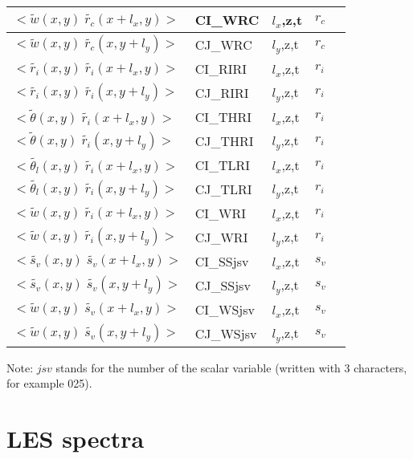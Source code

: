\begin{longtable}[c]{|p{}|p{}|p{}|p{}|p{}|}
$<\tilde{w}(x,y)\;\tilde{r_c}(x+l_x,y)>$             & CI\_WRC   & $l_x$,z,t & $r_c$       & \\\hline
$<\tilde{w}(x,y)\;\tilde{r_c}(x,y+l_y)>$             & CJ\_WRC   & $l_y$,z,t & $r_c$       & \\\hline
$<\tilde{r_i}(x,y)\;\tilde{r_i}(x+l_x,y)>$           & CI\_RIRI  & $l_x$,z,t & $r_i$       & \\\hline
$<\tilde{r_i}(x,y)\;\tilde{r_i}(x,y+l_y)>$           & CJ\_RIRI  & $l_y$,z,t & $r_i$       & \\\hline
$<\tilde{\theta}(x,y)\;\tilde{r_i}(x+l_x,y)>$        & CI\_THRI  & $l_x$,z,t & $r_i$       & \\\hline
$<\tilde{\theta}(x,y)\;\tilde{r_i}(x,y+l_y)>$        & CJ\_THRI  & $l_y$,z,t & $r_i$       & \\\hline
$<\tilde{\theta_l}(x,y)\;\tilde{r_i}(x+l_x,y)>$      & CI\_TLRI  & $l_x$,z,t & $r_i$       & \\\hline
$<\tilde{\theta_l}(x,y)\;\tilde{r_i}(x,y+l_y)>$      & CJ\_TLRI  & $l_y$,z,t & $r_i$       & \\\hline
$<\tilde{w}(x,y)\;\tilde{r_i}(x+l_x,y)>$             & CI\_WRI   & $l_x$,z,t & $r_i$       & \\\hline
$<\tilde{w}(x,y)\;\tilde{r_i}(x,y+l_y)>$             & CJ\_WRI   & $l_y$,z,t & $r_i$       & \\\hline
$<\tilde{s_v}(x,y)\;\tilde{s_v}(x+l_x,y)>$           & CI\_SSjsv & $l_x$,z,t & $s_v$       & \\\hline
$<\tilde{s_v}(x,y)\;\tilde{s_v}(x,y+l_y)>$           & CJ\_SSjsv & $l_y$,z,t & $s_v$       & \\\hline
$<\tilde{w}(x,y)\;\tilde{s_v}(x+l_x,y)>$             & CI\_WSjsv & $l_x$,z,t & $s_v$       & \\\hline
$<\tilde{w}(x,y)\;\tilde{s_v}(x,y+l_y)>$             & CJ\_WSjsv & $l_y$,z,t & $s_v$       & \\\hline
\end{longtable}
\endgroup

Note: $jsv$ stands for the number of the scalar variable (written with 3 characters, for example 025).


\section{LES spectra}

